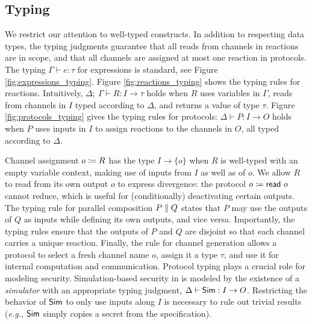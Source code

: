 \subsection{Typing}
We restrict our attention to well-typed \ipdl constructs. In addition to respecting data types, the typing judgments guarantee that all reads from channels in reactions are in scope, and that all channels are assigned at most one reaction in protocols. The typing $\Gamma \vdash e : \tau$ for expressions is standard, see Figure \ref{fig:expressions_typing}. Figure \ref{fig:reactions_typing} shows the typing rules for reactions. Intuitively, $\Delta; \ \Gamma \vdash R : I \to \tau$ holds when $R$ uses variables in $\Gamma$, reads from channels in $I$ typed according to $\Delta$, and returns a value of type $\tau$. Figure \ref{fig:protocols_typing} gives the typing rules for protocols: $\Delta \vdash P : I \to O$ holds when $P$ uses inputs in $I$ to assign reactions to the channels in $O$, all typed according to $\Delta$.

Channel assignment $o \coloneqq R$ has the type $I \to \{o\}$ 
when $R$ is well-typed with an empty variable context, making use of inputs from $I$ as well as of $o$. We allow $R$ to read from its own output $o$ to express divergence: the protocol $o \coloneqq \mathsf{read} \ o$ cannot reduce, which is useful for (conditionally) deactivating certain outputs. The typing rule for parallel composition $P \; \| \; Q$ states that $P$ may use the outputs of $Q$ as inputs while defining its own outputs, and vice versa. Importantly, the typing rules ensure that the outputs of $P$ and $Q$ are disjoint so that each channel carries a unique reaction. Finally, the rule for channel generation allows a protocol to select a fresh channel name $o$, assign it a type $\tau$, and use it for internal computation and communication. Protocol typing plays a crucial role for modeling security. 
Simulation-based security in \ipdl is modeled by the existence of a \emph{simulator}  with an appropriate typing judgment, $\Delta \vdash \mathsf{Sim} : I \to O$. Restricting the behavior of $\mathsf{Sim}$ to only use inputs along $I$ is necessary to rule out trivial results (\emph{e.g.}, $\mathsf{Sim}$ simply copies a secret from the specification).

